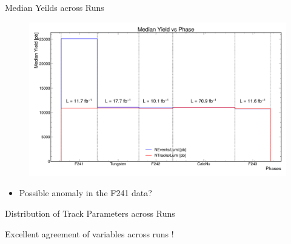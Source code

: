 \begin{frame}{Median Yeilds across Runs}
	\begin{figure}
		\includegraphics[width=\linewidth]{./RunwisePlots/MedianYieldsPhase.pdf}
	\end{figure}
	\vspace{-0.5cm}
	\begin{itemize}
		\item Possible anomaly in the F241 data?
	\end{itemize}
\end{frame}

\begin{frame}{Distribution of Track Parameters across Runs}
	\begin{center}
		Excellent agreement of variables across runs !
	\end{center}
	
\end{frame}


